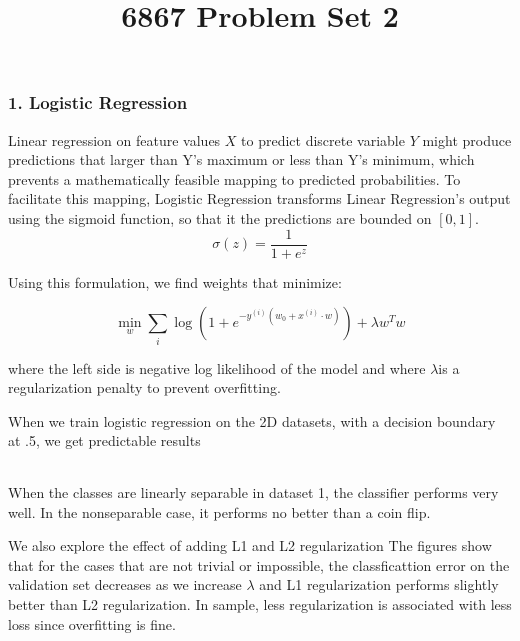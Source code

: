 \documentclass[10pt]{article}
\begin{document}
	\title{6867 Problem Set 2}
	\maketitle

\subsubsection*{1. Logistic Regression}
Linear regression on feature values $X$ to predict discrete variable $Y$ might produce predictions that larger
than Y's maximum or less than Y's minimum, which prevents a mathematically feasible mapping to predicted probabilities.
To facilitate this mapping, Logistic Regression transforms Linear Regression's output using the sigmoid function,
so that it the predictions are bounded on $[0,1]$.
\begin{equation}
	\sigma(z) = \frac{1}{1+e^{z}}
\end{equation}

Using this formulation, we find weights that minimize:

\begin{equation}
	\min_w \sum_i \log \left(1+e^{-y^{(i)}(w_0 + x^{(i)}\cdot w)} \right) + \lambda w^T w
\end{equation}

where the left side is negative log likelihood of the model and where $\lambda$is a regularization penalty to prevent overfitting.

When we train logistic regression on the 2D datasets, with a decision boundary at .5, we get predictable results

\begin{table}[ht]
\centering
{}
\begin{tabular}{lrrrr}
\end{tabular}
\end{table}

When the classes are linearly separable in dataset 1, the classifier performs very well. In the nonseparable case, it performs no better than a coin flip.

We also explore the effect of adding L1 and L2 regularization  The figures show that for the cases that are not trivial or impossible, 
the classficattion error on the validation set decreases as we increase $\lambda$ and L1 regularization performs
slightly better than L2 regularization. In sample, less regularization is associated with less loss since overfitting is fine.
\end{document}
